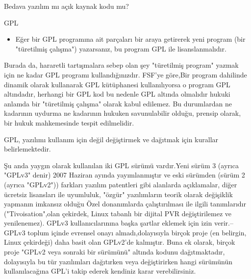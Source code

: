 \begin{section}{Bedava yazılım mı açık kaynak kodu mu?}
\begin{subsection}{GPL}
\begin{itemize}
Bu bağlamda "Kaynak kodu" almak demek yazılımı bilgisayarda çalıştırmak için gereken her şeyi almak demektir. Özel durumlar ne demektir-- örneğin kapalı bir bilgisayardaki değiştirilmiş Linux çekirdeğini uygun bir şekilde başlatmak için şifreleme anahtarları gerekebilir--bu hararetli bir tartışma konusudur.

Eğer biri para ile GPL yazılım satın alırsa, doğal olarak sadece bütün bilgisayarlarında çalıştırma hakkına sahiptir, kopyalayamaz ve yeniden satamaz.(GPL lisansı altında).Bunun bir sonucu olarak da "koltuk başına" GPL yazılım satmak  mantıklı bir iş değildir, bu durumun önemli bir sonucu olarakta fiyatlar açısından rahatlık sağlamasıdır bu sebeple Linux dağıtımları kullanmak mantıklıdır.

 \item Eğer bir GPL programına ait parçaları bir araya getirerek yeni program (bir "türetilmiş çalışma") yazarsanız, bu program GPL ile lisanslanmalıdır.
\end{itemize}

Burada da, hararetli tartışmalara sebep olan şey "türetilmiş program" yazmak için ne kadar GPL programı kullandığınızdır. FSF'ye göre,Bir program dahilinde dinamik olarak kullanarak GPL kütüphanesi kullanılıyorsa o program GPL altındadır, herhangi bir GPL kod  bu nedenle GPL altında olmalıdır hukuki anlamda bir "türetilmiş çalışma" olarak kabul edilemez. Bu durumlardan ne kadarının uydurma ne kadarının hukuken savunulabilir olduğu, prensip olarak, bir hukuk mahkemesinde tespit edilmelidir.

GPL, yazılımı kullanım için değil değiştirmek ve dağıtmak için kurallar belirlemektedir.

Şu anda  yaygın olarak kullanılan  iki GPL sürümü vardır.Yeni sürüm 3 (ayrıca "GPLv3" denir)  2007 Haziran ayında yayımlanmıştır ve eski sürümden (sürüm 2 (ayrıca "GPLv2")) farkları yazılım patentleri gibi alanlarda açıklamalar, diğer ücretsiz lisansları ile uyumluluk, "özgür" yazılımların teorik olarak değişiklik yapmanın imkansız olduğu Özel donanımlarda çalıştırılması ile ilgili tanımlarıdır ("Tivoisation",olan çekirdek, Linux tabanlı bir dijital PVR değiştirilemez ve yenilenemez). GPLv3 kullanıcılarınına başka şartlar eklemek için izin verir.--GPLv3 toplum içinde evrensel onayı almadı,dolayısıyla birçok proje (en belirgin, Linux çekirdeği) daha basit  olan GPLv2'de kalmıştır. Buna ek olarak, birçok proje "GPLv2 veya sonraki bir sürümünü" altında kodunu dağıtmaktadır, dolayısıyla bu tür yazılımları dağıtırken veya değiştirirken hangi sürümünün kullanılacağına GPL'i takip ederek kendiniz karar verebilirsiniz.


\end{subsection}
\end{section}
